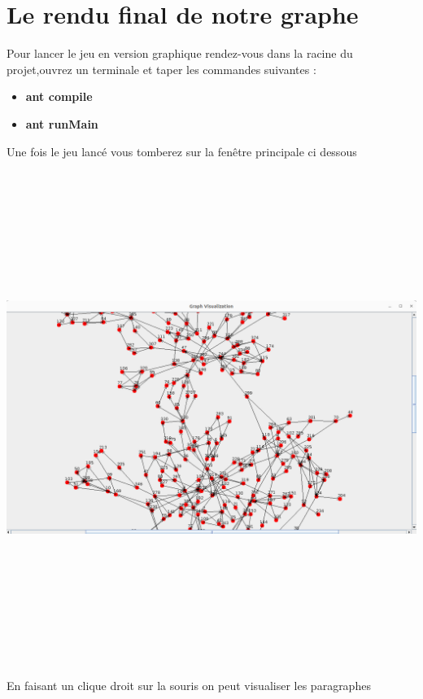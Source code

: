 \documentclass[12pt]{article}
\begin{document}
 
\section{Le rendu final de notre graphe}
Pour lancer le jeu en version graphique rendez-vous dans la racine du projet,ouvrez un
terminale et taper les commandes suivantes :

\begin{itemize}
 \item \textbf{ant compile}
 \item \textbf{ant runMain}
 
\end{itemize}


Une fois le jeu lancé vous tomberez sur la fenêtre principale ci dessous
   
\includegraphics[width=16cm,height=16cm]{images/rendu.png}

\vspace{12pt plus 5pt minus 5pt}

En faisant un clique droit sur la souris on peut visualiser les paragraphes
\end{document}
